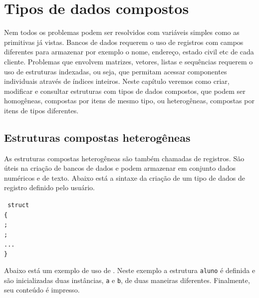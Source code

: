 \chapter{Tipos de dados compostos}
\label{chap:type}

Nem todos os problemas podem ser resolvidos com variáveis simples como as primitivas já vistas. Bancos de dados requerem o uso de registros com campos diferentes para armazenar por exemplo o nome, endereço, estado civil etc de cada cliente. Problemas que envolvem matrizes, vetores, listas e sequências requerem o uso de estruturas indexadas, ou seja, que permitam acessar componentes individuais através de índices inteiros. Neste capítulo veremos como criar, modificar e consultar estruturas com tipos de dados compostos, que podem ser homogêneas, compostas por itens de mesmo tipo, ou heterogêneas, compostas por itens de tipos diferentes.


\section{Estruturas compostas heterogêneas}

As estruturas compostas heterogêneas são também chamadas de registros. São úteis na criação de bancos de dados e podem armazenar em conjunto dados numéricos e de texto. Abaixo está a sintaxe da criação de um tipo de dados de registro definido pelo usuário.

\NEWLINE
{\tt
struct \\
\{\\
\TAB  {} ;\\
\TAB  {} ;\\
\TAB  ...\\
\}\\
}
\NEWLINE

Abaixo está um exemplo de uso de \STRUCT. Neste exemplo a estrutura {\tt aluno} é definida e são inicializadas duas instâncias, {\tt a} e {\tt b}, de duas maneiras diferentes. Finalmente, seu conteúdo é impresso.

